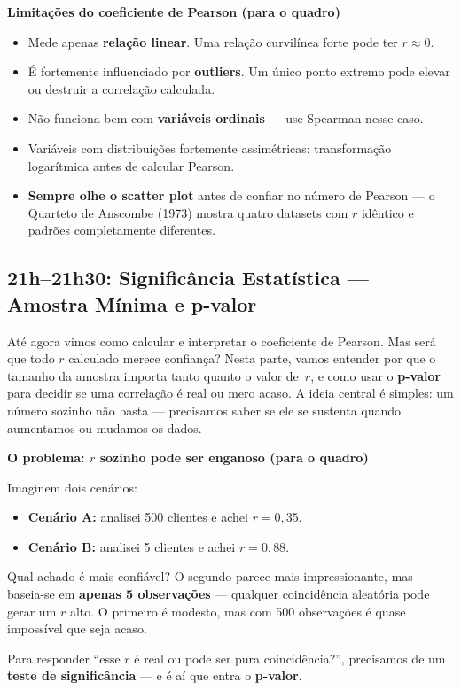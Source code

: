 \begin{BoardBox}
\textbf{Limitações do coeficiente de Pearson (para o quadro)}
\begin{itemize}
  \item Mede apenas \textbf{relação linear}. Uma relação curvilínea forte pode ter
  $r \approx 0$.
  \item É fortemente influenciado por \textbf{outliers}. Um único ponto extremo
  pode elevar ou destruir a correlação calculada.
  \item Não funciona bem com \textbf{variáveis ordinais} — use Spearman nesse caso.
  \item Variáveis com distribuições fortemente assimétricas: transformação logarítmica
  antes de calcular Pearson.
  \item \textbf{Sempre olhe o scatter plot} antes de confiar no número de Pearson —
  o Quarteto de Anscombe (1973) mostra quatro datasets com $r$ idêntico e padrões
  completamente diferentes.
\end{itemize}
\end{BoardBox}

\subsection{21h–21h30: Significância Estatística — Amostra Mínima e p-valor}

Até agora vimos como calcular e interpretar o coeficiente de Pearson.
Mas será que todo $r$ calculado merece confiança?
Nesta parte, vamos entender por que o tamanho da amostra importa tanto
quanto o valor de~$r$, e como usar o \textbf{p-valor} para decidir se
uma correlação é real ou mero acaso.
A ideia central é simples: um número sozinho não basta — precisamos
saber se ele se sustenta quando aumentamos ou mudamos os dados.

\begin{BoardBox}
\textbf{O problema: $r$ sozinho pode ser enganoso (para o quadro)}

Imaginem dois cenários:
\begin{itemize}
  \item \textbf{Cenário A:} analisei 500 clientes e achei $r = 0{,}35$.
  \item \textbf{Cenário B:} analisei 5 clientes e achei $r = 0{,}88$.
\end{itemize}

Qual achado é mais confiável? O segundo parece mais impressionante,
mas baseia-se em \textbf{apenas 5 observações} — qualquer coincidência
aleatória pode gerar um $r$ alto. O primeiro é modesto, mas com 500
observações é quase impossível que seja acaso.

Para responder ``esse $r$ é real ou pode ser pura coincidência?'',
precisamos de um \textbf{teste de significância} — e é aí que entra
o \textbf{p-valor}.
\end{BoardBox}

